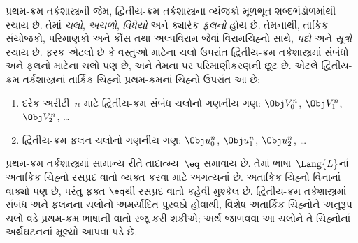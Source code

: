 
\label{guunit:OLP-0716}


પ્રથમ-ક્રમ તર્કશાસ્ત્રની જેમ, દ્વિતીય-ક્રમ તર્કશાસ્ત્રના
વ્યંજકો મૂળભૂત શબ્દભંડોળમાંથી રચાય છે. તેમાં
\emph{ચલો}, \emph{અચળો},
\emph{વિધેયો} અને ક્યારેક \emph{ફલનો}
હોય છે. તેમનાથી, તાર્કિક સંયોજકો, પરિમાણકો અને કૌંસ તથા
અલ્પવિરામ જેવાં વિરામચિહ્નો સાથે, \emph{પદો} અને
\emph{સૂત્રો} રચાય છે.
ફરક એટલો છે કે વસ્તુઓ માટેના ચલો ઉપરાંત દ્વિતીય-ક્રમ
તર્કશાસ્ત્રમાં સંબંધો અને ફલનો માટેના ચલો પણ છે,
અને તેમના પર પરિમાણીકરણની છૂટ છે.
એટલે દ્વિતીય-ક્રમ તર્કશાસ્ત્રનાં તાર્કિક ચિહ્નો
પ્રથમ-ક્રમનાં ચિહ્નો ઉપરાંત આ છે:

\begin{enumerate}
\item દરેક અરીટી~$n$ માટે દ્વિતીય-ક્રમ સંબંધ
ચલોનો ગણનીય ગણ:
$\Obj V_0^n$, $\Obj V_1^n$, $\Obj V_2^n$, \dots
\item દ્વિતીય-ક્રમ ફલન ચલોનો ગણનીય ગણ:
$\Obj u_0^n$, $\Obj u_1^n$, $\Obj u_2^n$, \dots
\end{enumerate}

પ્રથમ-ક્રમ તર્કશાસ્ત્રમાં સામાન્ય રીતે તાદાત્મ્ય~$\eq$
સમાવાય છે. તેમાં ભાષા~$\Lang{L}$નાં અતાર્કિક ચિહ્નો
રસપ્રદ વાતો વ્યક્ત કરવા માટે અગત્યનાં છે.
અતાર્કિક ચિહ્નો વિનાનાં વાક્યો પણ છે,
પરંતુ ફક્ત $\eq$થી રસપ્રદ વાતો કહેવી મુશ્કેલ છે.
દ્વિતીય-ક્રમ તર્કશાસ્ત્રમાં સંબંધ અને ફલનના ચલોનો અમર્યાદિત
પુરવઠો હોવાથી, વિશેષ અતાર્કિક ચિહ્નોને અનુરૂપ ચલો વડે
પ્રથમ-ક્રમ ભાષાની વાતો રજૂ કરી શકીએ;
અર્થ જાળવવા આ ચલોને તે ચિહ્નોનાં અર્થઘટનનાં મૂલ્યો આપવા પડે છે.
\endgroup
\endgroup


\begingroup
\makeatletter{}\makeatother

\label{guunit:OLP-0330}


